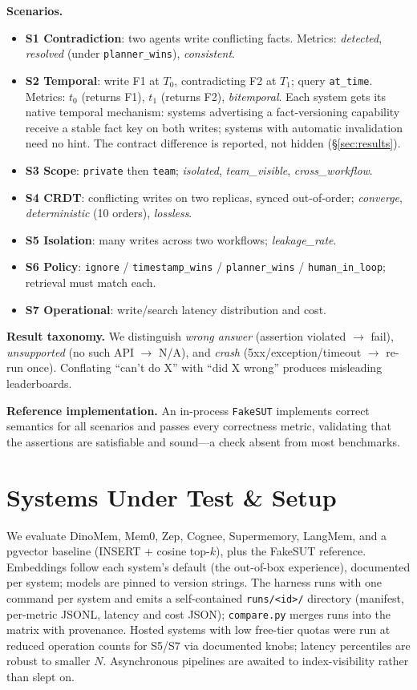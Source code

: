 \documentclass[11pt]{article}
\begin{document}
\textbf{Scenarios.}
\begin{itemize}
  \item \textbf{S1 Contradiction}: two agents write conflicting facts. Metrics:
  \emph{detected}, \emph{resolved} (under \texttt{planner\_wins}), \emph{consistent}.
  \item \textbf{S2 Temporal}: write F1 at $T_0$, contradicting F2 at $T_1$; query
  \texttt{at\_time}. Metrics: $t_0$ (returns F1), $t_1$ (returns F2), \emph{bitemporal}.
  Each system gets its native temporal mechanism: systems advertising a
  fact-versioning capability receive a stable fact key on both writes; systems with
  automatic invalidation need no hint. The contract difference is reported, not
  hidden (\S\ref{sec:results}).
  \item \textbf{S3 Scope}: \texttt{private} then \texttt{team}; \emph{isolated},
  \emph{team\_visible}, \emph{cross\_workflow}.
  \item \textbf{S4 CRDT}: conflicting writes on two replicas, synced out-of-order;
  \emph{converge}, \emph{deterministic} (10 orders), \emph{lossless}.
  \item \textbf{S5 Isolation}: many writes across two workflows; \emph{leakage\_rate}.
  \item \textbf{S6 Policy}: \texttt{ignore} / \texttt{timestamp\_wins} /
  \texttt{planner\_wins} / \texttt{human\_in\_loop}; retrieval must match each.
  \item \textbf{S7 Operational}: write/search latency distribution and cost.
\end{itemize}

\textbf{Result taxonomy.}\label{sec:taxonomy} We distinguish \emph{wrong answer}
(assertion violated $\to$ fail), \emph{unsupported} (no such API $\to$ N/A), and
\emph{crash} (5xx/exception/timeout $\to$ re-run once). Conflating ``can't do X''
with ``did X wrong'' produces misleading leaderboards.

\textbf{Reference implementation.} An in-process \texttt{FakeSUT} implements correct
semantics for all scenarios and passes every correctness metric, validating that the
assertions are satisfiable and sound---a check absent from most benchmarks.

\section{Systems Under Test \& Setup}\label{sec:sut}
We evaluate DinoMem, Mem0, Zep, Cognee, Supermemory, LangMem, and a pgvector
baseline (INSERT + cosine top-$k$), plus the FakeSUT reference. Embeddings follow each
system's default (the out-of-box experience), documented per system; models are
pinned to version strings. The harness runs with one command per system and emits a
self-contained \texttt{runs/<id>/} directory (manifest, per-metric JSONL, latency and
cost JSON); \texttt{compare.py} merges runs into the matrix with provenance. Hosted
systems with low free-tier quotas were run at reduced operation counts for S5/S7 via
documented knobs; latency percentiles are robust to smaller $N$. Asynchronous
pipelines are awaited to index-visibility rather than slept on.
\end{document}
